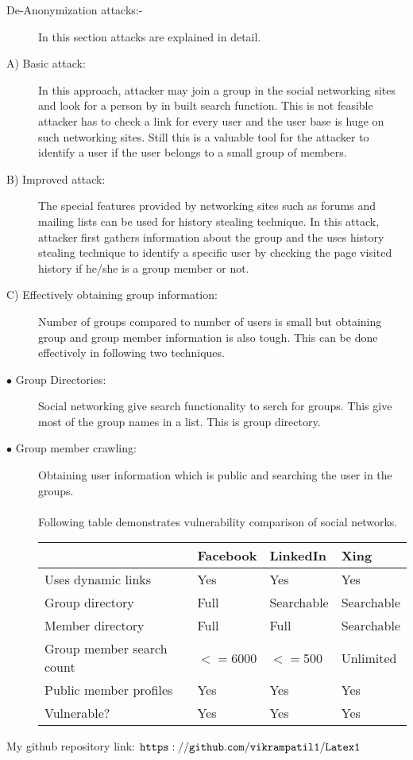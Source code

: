 \documentclass{article}
\begin{document}
\begin{description}
\item[De-Anonymization attacks:-]
\item[]In this section attacks are explained in detail.
\item[A)	Basic attack:]
\item[]In this approach, attacker may join a group in the social networking sites and look for a person by in built search function. This is not feasible attacker has to check a link for every user and the user base is huge on such networking sites. Still this is a valuable tool for the attacker to identify a user if the user belongs to a small group of members.
\item[B)	Improved attack:]
\item[]The special features provided by networking sites such as forums and mailing lists can be used for history stealing technique. In this attack, attacker first gathers information about the group and the uses history stealing technique to identify a specific user by checking the page visited history if he/she is a group member or not.
\item[C)	Effectively obtaining group information:]
\item[]Number of groups compared to number of users is small but obtaining group and group member information is also tough. This can be done effectively in following two techniques.
\item[$\bullet$ Group Directories:] Social networking give search functionality to serch for groups. This give most of the group names in a list. This is group directory.
\item[$\bullet$ Group member crawling:] Obtaining user information which is public and searching the user in the groups.\\\\
Following table demonstrates vulnerability comparison of social networks.


\begin{table}[ht]
\begin{tabular}{ |p{3cm}||p{2cm}| |p{2cm}||p{2cm}|}
\hline
 &Facebook&LinkedIn&Xing\\
\hline
Uses dynamic links	&Yes&Yes&Yes\\
\hline
Group directory&Full&Searchable&Searchable\\
\hline
Member directory&Full	&Full&Searchable\\
\hline
Group member search count&$<=$6000&$<=$500&	Unlimited\\
\hline
Public member profiles	&Yes&Yes&Yes\\
\hline
Vulnerable?&Yes&Yes&Yes\\
\hline
\end{tabular}
\end{table}
\end{description}
My github repository link: {$\tt https://github.com/vikrampatil1/Latex1$}	
\end{document}
